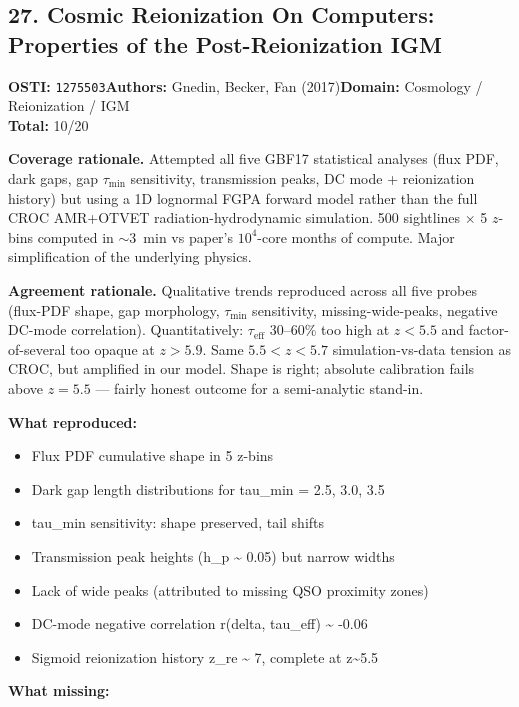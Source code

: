 \subsection{27. Cosmic Reionization On Computers: Properties of the Post-Reionization IGM}
\textbf{OSTI:} \texttt{1275503}\quad\textbf{Authors:} Gnedin, Becker, Fan (2017)\quad\textbf{Domain:} Cosmology / Reionization / IGM\\
\quad{}\quad\textbf{Total:} 10/20\par\smallskip
\noindent\textbf{Coverage rationale.} Attempted all five GBF17 statistical analyses (flux PDF, dark gaps, gap $\tau_\mathrm{min}$ sensitivity, transmission peaks, DC mode + reionization history) but using a 1D lognormal FGPA forward model rather than the full CROC AMR+OTVET radiation-hydrodynamic simulation. 500 sightlines $\times$ 5 $z$-bins computed in $\sim$3~min vs paper's $10^4$-core months of compute. Major simplification of the underlying physics.\par
\noindent\textbf{Agreement rationale.} Qualitative trends reproduced across all five probes (flux-PDF shape, gap morphology, $\tau_\mathrm{min}$ sensitivity, missing-wide-peaks, negative DC-mode correlation). Quantitatively: $\tau_\mathrm{eff}$ 30--60\% too high at $z<5.5$ and factor-of-several too opaque at $z>5.9$. Same $5.5<z<5.7$ simulation-vs-data tension as CROC, but amplified in our model. Shape is right; absolute calibration fails above $z=5.5$ --- fairly honest outcome for a semi-analytic stand-in.\par\smallskip
\noindent\textbf{What reproduced:}
\begin{itemize}[leftmargin=1.4em,itemsep=0.2em,topsep=0.2em]
\item Flux PDF cumulative shape in 5 z-bins
\item Dark gap length distributions for tau\_min = 2.5, 3.0, 3.5
\item tau\_min sensitivity: shape preserved, tail shifts
\item Transmission peak heights (h\_p \textasciitilde{} 0.05) but narrow widths
\item Lack of wide peaks (attributed to missing QSO proximity zones)
\item DC-mode negative correlation r(delta, tau\_eff) \textasciitilde{} -0.06
\item Sigmoid reionization history z\_re \textasciitilde{} 7, complete at z\textasciitilde{}5.5
\end{itemize}\noindent\textbf{What missing:}
